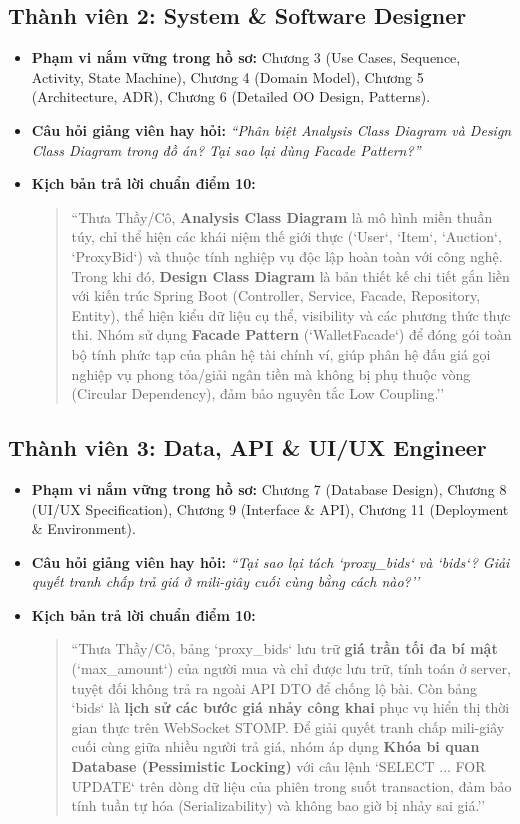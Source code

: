 \documentclass[11pt,a4paper]{article}
\begin{document}
\subsection{Thành viên 2: System \& Software Designer}
\begin{itemize}[leftmargin=*]
    \item \textbf{Phạm vi nắm vững trong hồ sơ:} Chương 3 (Use Cases, Sequence, Activity, State Machine), Chương 4 (Domain Model), Chương 5 (Architecture, ADR), Chương 6 (Detailed OO Design, Patterns).
    \item \textbf{Câu hỏi giảng viên hay hỏi:} \textit{``Phân biệt Analysis Class Diagram và Design Class Diagram trong đồ án? Tại sao lại dùng Facade Pattern?''}
    \item \textbf{Kịch bản trả lời chuẩn điểm 10:}
    \begin{quote}
        \small ``Thưa Thầy/Cô, \textbf{Analysis Class Diagram} là mô hình miền thuần túy, chỉ thể hiện các khái niệm thế giới thực (`User`, `Item`, `Auction`, `ProxyBid`) và thuộc tính nghiệp vụ độc lập hoàn toàn với công nghệ. Trong khi đó, \textbf{Design Class Diagram} là bản thiết kế chi tiết gắn liền với kiến trúc Spring Boot (Controller, Service, Facade, Repository, Entity), thể hiện kiểu dữ liệu cụ thể, visibility và các phương thức thực thi. Nhóm sử dụng \textbf{Facade Pattern} (`WalletFacade`) để đóng gói toàn bộ tính phức tạp của phân hệ tài chính ví, giúp phân hệ đấu giá gọi nghiệp vụ phong tỏa/giải ngân tiền mà không bị phụ thuộc vòng (Circular Dependency), đảm bảo nguyên tắc Low Coupling.''
    \end{quote}
\end{itemize}

\subsection{Thành viên 3: Data, API \& UI/UX Engineer}
\begin{itemize}[leftmargin=*]
    \item \textbf{Phạm vi nắm vững trong hồ sơ:} Chương 7 (Database Design), Chương 8 (UI/UX Specification), Chương 9 (Interface \& API), Chương 11 (Deployment \& Environment).
    \item \textbf{Câu hỏi giảng viên hay hỏi:} \textit{``Tại sao lại tách `proxy_bids` và `bids`? Giải quyết tranh chấp trả giá ở mili-giây cuối cùng bằng cách nào?''}
    \item \textbf{Kịch bản trả lời chuẩn điểm 10:}
    \begin{quote}
        \small ``Thưa Thầy/Cô, bảng `proxy_bids` lưu trữ \textbf{giá trần tối đa bí mật} (`max_amount`) của người mua và chỉ được lưu trữ, tính toán ở server, tuyệt đối không trả ra ngoài API DTO để chống lộ bài. Còn bảng `bids` là \textbf{lịch sử các bước giá nhảy công khai} phục vụ hiển thị thời gian thực trên WebSocket STOMP. Để giải quyết tranh chấp mili-giây cuối cùng giữa nhiều người trả giá, nhóm áp dụng \textbf{Khóa bi quan Database (Pessimistic Locking)} với câu lệnh `SELECT ... FOR UPDATE` trên dòng dữ liệu của phiên trong suốt transaction, đảm bảo tính tuần tự hóa (Serializability) và không bao giờ bị nhảy sai giá.''
    \end{quote}
\end{itemize}
\end{document}
